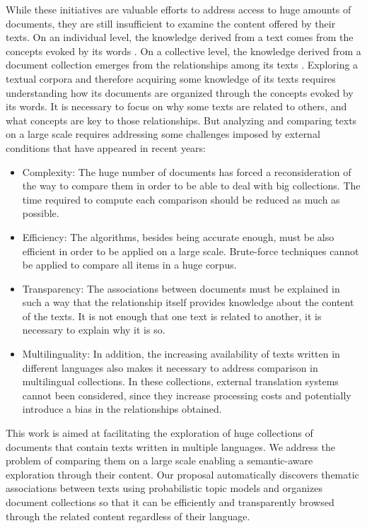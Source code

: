 While these initiatives are valuable efforts to address access to huge amounts of documents, they are still insufficient to examine the content offered by their texts. On an individual level, the knowledge derived from a text comes from the concepts evoked by its words \cite{Griffiths2007}. On a collective level, the knowledge derived from a document collection emerges from the relationships among its texts \cite{Kenter2015}. Exploring a textual corpora and therefore acquiring some knowledge of its texts requires understanding how its documents are organized through the concepts evoked by its words. It is necessary to focus on why some texts are related to others, and what concepts are key to those relationships. But analyzing and comparing texts on a large scale requires addressing some challenges imposed by external conditions that have appeared in recent years:
\begin{itemize}
\item Complexity: The huge number of documents has forced a reconsideration of the way to compare them in order to be able to deal with big collections. The time required to compute each comparison should be reduced as much as possible.
\item Efficiency: The algorithms, besides being accurate enough, must be also efficient in order to be applied on a large scale. Brute-force techniques cannot be applied to compare all items in a huge corpus.
\item Transparency: The associations between documents must be explained in such a way that the relationship itself provides knowledge about the content of the texts. It is not enough that one text is related to another, it is necessary to explain why it is so. 
\item Multilinguality: In addition, the increasing availability of texts written in different languages also makes it necessary to address comparison in multilingual collections. In these collections, external translation systems cannot been considered, since they increase processing costs and potentially introduce a bias in the relationships obtained. 
\end{itemize}

This work is aimed at facilitating the exploration of huge collections of documents that contain texts written in multiple languages. We address the problem of comparing them on a large scale enabling a semantic-aware exploration through their content. Our proposal automatically discovers thematic associations between texts using probabilistic topic models and organizes document collections so that it can be efficiently and transparently browsed through the related content regardless of their language.

